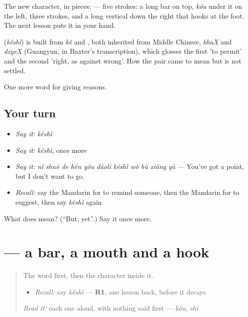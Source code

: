 The new character, in pieces:  — five strokes: a long bar on top,  \emph{kǒu} under it on the left, three strokes, and a long vertical down the right that hooks at the foot. The next lesson puts it in your hand.

\begin{cousinweb}
\textbf{} (\emph{kěshì}) is built from \emph{kě} and , both inherited from Middle Chinese, \emph{khaX} and \emph{dzyeX} (Guangyun, in Baxter's transcription), which glosses the first 'to permit' and the second 'right, as against wrong'. How the pair came to mean but is not settled.
\end{cousinweb}

\begin{grammarlens}[title={What you've built}]
One more word for giving reasons.
\end{grammarlens}

\subsection*{Your turn}
\begin{itemize}
\raggedright
  \item \emph{Say it:} \emph{kěshì}
  \item \emph{Say it:} \emph{kěshì}, once more
  \item \emph{Say it:} \emph{nǐ shuō de hěn yǒu dàoli kěshì wǒ bù xiǎng qù} — You've got a point, but I don't want to go.
  \item \emph{Recall:} say the Mandarin for to remind someone, then the Mandarin for to suggest, then say \emph{kěshì} again
\end{itemize}

\begin{tcolorbox}[breakable,colback=teal!4,colframe=teal!35!black,title={Before you move on}]
What does  mean? (\textquotedblleft{}But; yet\textquotedblright{}.) Say it once more.
\end{tcolorbox}
\section[\texorpdfstring{\zh{可} (kě)}{可 (kě)}]{ — a bar, a mouth and a hook}

\label{lesson:ZH-W365-ke-can}



\begin{quote}
The word first, then the character inside it.

\begin{itemize}
\raggedright
  \item \emph{Recall:} say \emph{kěshì} — \textbf{R1}, one lesson back, before it decays
\end{itemize}

\begin{quote}
 
\end{quote}

\emph{Read it:} each one aloud, with nothing said first — \emph{kǒu}, \emph{shì}
\end{quote}

